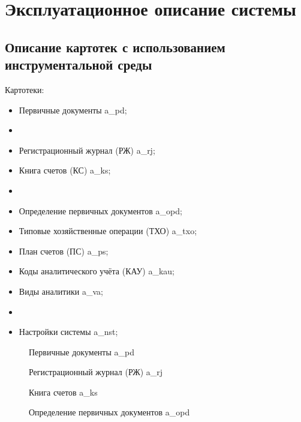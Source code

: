 \section{Эксплуатационное описание системы}

\subsection{Описание картотек с использованием инструментальной среды}

Картотеки:

\begin{itemize}
    \item Первичные документы \gpiFIO\/a\_pd;
    \item[] \hspace{0pt}
    \item Регистрационный журнал (РЖ) \gpiFIO\/a\_rj;
    \item Книга счетов (КС) \gpiFIO\/a\_ks;
    \item[] \hspace{0pt}
    \item Определение первичных документов \gpiFIO\/a\_opd;
    \item Типовые хозяйственные операции (ТХО) \gpiFIO\/a\_txo;
    \item План счетов (ПС) \gpiFIO\/a\_ps;
    \item Коды аналитического учёта (КАУ) \gpiFIO\/a\_kau;
    \item Виды аналитики \gpiFIO\/a\_va;
    \item[] \hspace{0pt}
    \item Настройки системы \gpiFIO\/a\_nst;
\end{itemize}

\begin{figure}[!htb]
    \centering
    \caption{Первичные документы \gpiFIO\/a\_pd}
\end{figure}

\begin{figure}[!htb]
    \centering
    \caption{Регистрационный журнал (РЖ) \gpiFIO\/a\_rj}
\end{figure}

\begin{figure}[!htb]
    \centering
    \caption{Книга счетов \gpiFIO\/a\_ks}
\end{figure}

\begin{figure}[!htb]
    \centering
    \caption{Определение первичных документов \gpiFIO\/a\_opd}
\end{figure}

